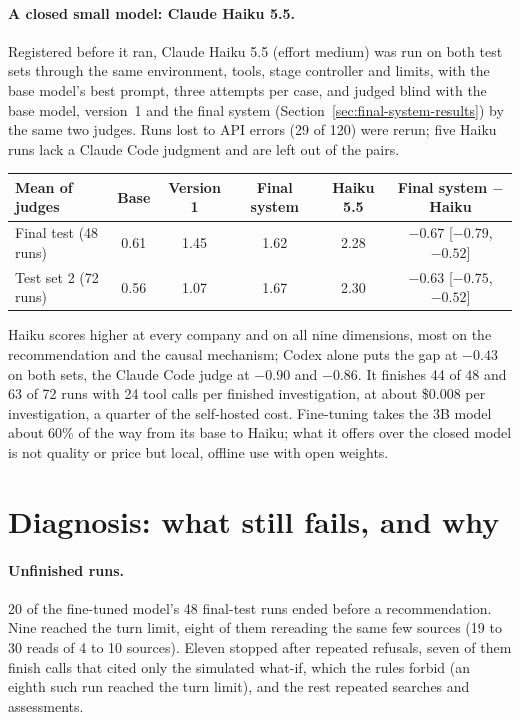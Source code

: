 \paragraph{A closed small model: Claude Haiku 5.5.}\label{sec:haiku} Registered before it ran, Claude Haiku 5.5 (effort
medium) was run on both test sets through the same environment, tools, stage controller and limits, with the base
model's best prompt, three attempts per case, and judged blind with the base model, version~1 and the final system
(Section~\ref{sec:final-system-results}) by the same two judges. Runs lost to API errors (29 of 120) were rerun; five Haiku
runs lack a Claude Code judgment and are left out of the pairs.

\begin{center}
\small
\begin{tabular}{@{}lccccc@{}}
\toprule
Mean of judges & Base & Version 1 & Final system & Haiku 5.5 & Final system $-$ Haiku\\
\midrule
Final test (48 runs) & 0.61 & 1.45 & 1.62 & 2.28 & $-0.67$ [$-0.79$, $-0.52$]\\
Test set 2 (72 runs) & 0.56 & 1.07 & 1.67 & 2.30 & $-0.63$ [$-0.75$, $-0.52$]\\
\bottomrule
\end{tabular}
\end{center}

Haiku scores higher at every company and on all nine dimensions, most on the recommendation and the causal mechanism;
Codex alone puts the gap at $-0.43$ on both sets, the Claude Code judge at $-0.90$ and $-0.86$. It finishes 44 of 48 and
63 of 72 runs with 24 tool calls per finished investigation, at about \$0.008 per investigation, a quarter of the
self-hosted cost. Fine-tuning takes the 3B model about 60\% of the way from its base to Haiku; what it offers over the
closed model is not quality or price but local, offline use with open weights.

\section{Diagnosis: what still fails, and why}\label{sec:diagnosis}

\paragraph{Unfinished runs.} 20 of the fine-tuned model's 48 final-test runs ended before a recommendation. Nine reached
the turn limit, eight of them rereading the same few sources (19 to 30 reads of 4 to 10 sources). Eleven stopped after
repeated refusals, seven of them finish calls that cited only the simulated what-if, which the rules forbid (an eighth
such run reached the turn limit), and the rest repeated searches and assessments.

